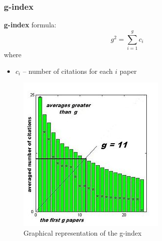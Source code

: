 \documentclass{beamer}
\begin{document}
\begin{frame}
    \frametitle{g-index}
    \textbf{g-index} formula:
    \[
        g^2 = \sum\limits_{i=1}^g c_i
    \]
    where
    \begin{itemize}
        \item $c_i$ -- number of citations for each $i$ paper
    \end{itemize}

    \begin{figure}[g]
        \includegraphics[height=0.44\textheight]{g-index_wiki.jpg}
        \caption{Graphical representation of the g-index}
    \end{figure}
\end{frame}
\end{document}
